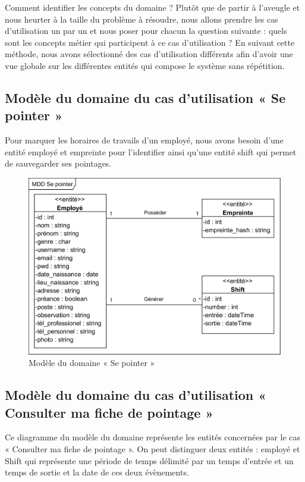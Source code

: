Comment identifier les concepts du domaine ? Plutôt que de partir à l’aveugle 
et nous heurter à la taille du problème à résoudre, nous allons prendre les cas 
d’utilisation un par un et nous poser pour chacun la question suivante : quels 
sont les concepts métier qui participent à ce cas d’utilisation ? En suivant 
cette méthode, nous avons sélectionné des cas d’utilisation différents afin 
d’avoir une vue globale sur les différentes entités qui compose le système 
sans répétition.

\subsection*{Modèle du domaine du cas d'utilisation « Se pointer »}
Pour marquer les horaires de travails d’un employé, nous avons besoin d’une 
entité employé et empreinte pour l’identifier ainsi qu’une entité shift qui 
permet de sauvegarder ses pointages. 

\begin{figure}[h!]
    \centering
    \includegraphics[scale=1.3]{images/MDD/MDD Se pointer.png}
    \caption{Modèle du domaine « Se pointer »}
    \label{fig12}
\end{figure}


\subsection*{Modèle du domaine du cas d'utilisation « Consulter ma fiche de pointage »}
Ce diagramme du modèle du domaine représente les entités concernées par le cas 
« Consulter ma fiche de pointage ». On peut distinguer deux entités : employé 
et Shift qui représente une période de temps délimité par un temps d’entrée et 
un temps de sortie et la date de ces deux évènements.

